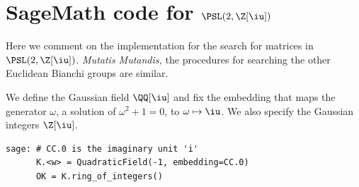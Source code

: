 \documentclass[runningheads]{llncs}
\begin{document}
\section{SageMath code for \texorpdfstring{\(\PSL(2,\Z[\iu])\)}{PSL(2,Z[i])}}
Here we comment on the implementation for the search for matrices in \(\PSL(2,\Z[\iu])\). \textit{Mutatis Mutandis,} the procedures for searching the other Euclidean Bianchi groups are similar.


\medskip
We define the Gaussian field \(\QQ[\iu]\) and fix the embedding that maps the generator \(\omega\), a solution of \(\omega^2+1=0\), to \(\omega \mapsto \iu\).  We also specify the Gaussian integers \(\Z[\iu]\).
%
\begin{lstlisting}
sage: # CC.0 is the imaginary unit 'i'
      K.<w> = QuadraticField(-1, embedding=CC.0)
      OK = K.ring_of_integers()
\end{lstlisting}
\end{document}
